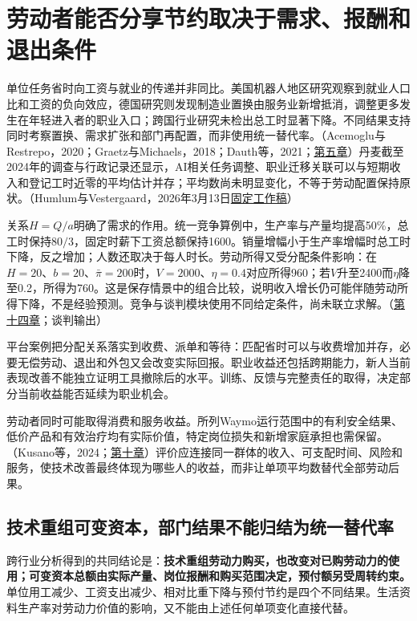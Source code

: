 \documentclass[UTF8,fontset=windows,12pt,a4paper,oneside,openany]{ctexbook}
\begin{document}
\section{劳动者能否分享节约取决于需求、报酬和退出条件}

单位任务省时向工资与就业的传递并非同比。美国机器人地区研究观察到就业人口比和工资的负向效应，德国研究则发现制造业置换由服务业新增抵消，调整更多发生在年轻进入者的职业入口；跨国行业研究未检出总工时显著下降。不同结果支持同时考察置换、需求扩张和部门再配置，而非使用统一替代率。（Acemoglu与Restrepo，2020；Graetz与Michaels，2018；Dauth等，2021；\hyperref[ch:5]{第五章}）丹麦截至2024年的调查与行政记录还显示，AI相关任务调整、职业迁移关联可以与短期收入和登记工时近零的平均估计并存；平均数尚未明显变化，不等于劳动配置保持原状。（Humlum与Vestergaard，2026年3月13日\href{https://www.rfberlin.com/wp-content/uploads/2026/03/26078.pdf}{固定工作稿}）

关系$H=Q/a$明确了需求的作用。统一竞争算例中，生产率与产量均提高50\%，总工时保持$80/3$，固定时薪下工资总额保持1600。销量增幅小于生产率增幅时总工时下降，反之增加；人数还取决于每人时长。劳动所得又受分配条件影响：在$H=20$、$b=20$、$\bar\pi=200$时，$V=2000$、$\eta=0.4$对应所得960；若$V$升至2400而$\eta$降至0.2，所得为760。这是保存情景中的组合比较，说明收入增长仍可能伴随劳动所得下降，不是经验预测。竞争与谈判模块使用不同给定条件，尚未联立求解。（\hyperref[ch:14]{第十四章}；谈判输出）

平台案例把分配关系落实到收费、派单和等待：匹配省时可以与收费增加并存，必要无偿劳动、退出和外包又会改变实际回报。职业收益还包括跨期能力，新人当前表现改善不能独立证明工具撤除后的水平。训练、反馈与完整责任的取得，决定部分当前收益能否延续为职业机会。

劳动者同时可能取得消费和服务收益。所列Waymo运行范围中的有利安全结果、低价产品和有效治疗均有实际价值，特定岗位损失和新增家庭承担也需保留。（Kusano等，2024；\hyperref[ch:10]{第十章}）评价应连接同一群体的收入、可支配时间、风险和服务，使技术改善最终体现为哪些人的收益，而非让单项平均数替代全部劳动后果。

\subsection{技术重组可变资本，部门结果不能归结为统一替代率}

跨行业分析得到的共同结论是：\textbf{技术重组劳动力购买，也改变对已购劳动力的使用；可变资本总额由实际产量、岗位报酬和购买范围决定，预付额另受周转约束。}单位用工减少、工资支出减少、相对比重下降与预付节约是四个不同结果。生活资料生产率对劳动力价值的影响，又不能由上述任何单项变化直接代替。
\end{document}
